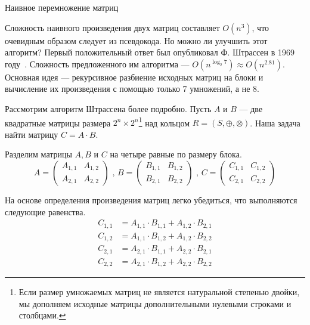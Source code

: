 \begin{algorithm}
\begin{algorithmic}[1]\label{algo:MxM}
\caption{Наивное перемножение матриц}
    \EndFor
    \EndFor
    \EndFor

\EndFunction
\end{algorithmic}
\end{algorithm}

Сложность наивного произведения двух матриц составляет $O(n^3)$, что очевидным образом следует из псевдокода. Но можно ли улучшить этот алгоритм? Первый положительный ответ был опубликовал Ф. Штрассен в 1969 году~\cite{Strassen1969}. Сложность предложенного им алгоритма --- $O(n^{\log_2 7}) \approx O(n^{2.81})$. Основная идея --- рекурсивное разбиение исходных матриц на блоки и вычисление их произведения с помощью только 7 умножений, а не 8.

Рассмотрим алгоритм Штрассена более подробно. Пусть $A$ и $B$ --- две квадратные матрицы размера $2^n \times 2^n$\footnote{Если размер умножаемых матриц не является натуральной степенью двойки, мы дополняем исходные матрицы дополнительными нулевыми строками и столбцами.} над кольцом $R=(S,\oplus,\otimes)$. Наша задача найти матрицу $C = A \cdot B$.

Разделим матрицы $A, B$ и $C$ на четыре равные по размеру блока.
$$
A =
\begin{pmatrix}
  A_{1,1} & A_{1,2} \\
  A_{2,1} & A_{2,2}
 \end{pmatrix} \mbox{ , }
 B =
 \begin{pmatrix}
   B_{1,1} & B_{1,2} \\
   B_{2,1} & B_{2,2}
 \end{pmatrix} \mbox{ , }
 C =
 \begin{pmatrix}
   C_{1,1} & C_{1,2} \\
   C_{2,1} & C_{2,2}
 \end{pmatrix}
$$

На основе определения произведения матриц легко убедиться, что выполняются следующие равенства.
\begin {align*}
C_{1,1}&= A_{1,1} \cdot B_{1,1} + A_{1,2} \cdot B_{2,1} \\
C_{1,2}&= A_{1,1} \cdot B_{1,2} + A_{1,2} \cdot B_{2,2} \\
C_{2,1}&= A_{2,1} \cdot B_{1,1} + A_{2,2} \cdot B_{2,1} \\
C_{2,2}&= A_{2,1} \cdot B_{1,2} + A_{2,2} \cdot B_{2,2}
\end {align*}


